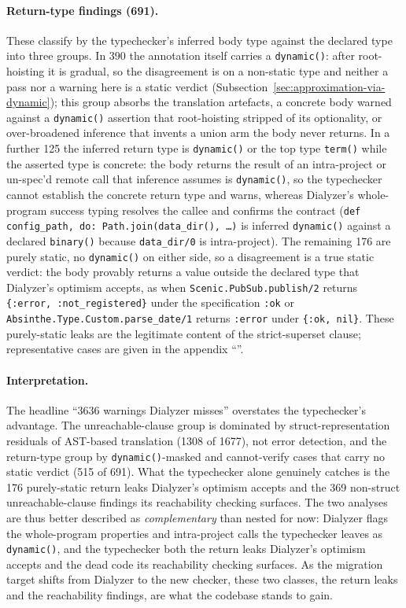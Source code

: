 \paragraph{Return-type findings (691).}
These classify by the typechecker's inferred body type against the declared type into three groups.
In \num{390} the annotation itself carries a \texttt{dynamic()}: after root-hoisting it is gradual, so the disagreement is on a non-static type and neither a pass nor a warning here is a static verdict (Subsection~\ref{sec:approximation-via-dynamic}); this group absorbs the translation artefacts, a concrete body warned against a \texttt{dynamic()} assertion that root-hoisting stripped of its optionality, or over-broadened inference that invents a union arm the body never returns.
In a further 125 the inferred return type is \texttt{dynamic()} or the top type \texttt{term()} while the asserted type is concrete: the body returns the result of an intra-project or un-spec'd remote call that inference assumes is \texttt{dynamic()}, so the typechecker cannot establish the concrete return type and warns, whereas Dialyzer's whole-program success typing resolves the callee and confirms the contract (\texttt{def config\_path, do: Path.join(data\_dir(), \dots)} is inferred \texttt{dynamic()} against a declared \texttt{binary()} because \texttt{data\_dir/0} is intra-project).
The remaining 176 are purely static, no \texttt{dynamic()} on either side, so a disagreement is a true static verdict: the body provably returns a value outside the declared type that Dialyzer's optimism accepts, as when \texttt{Scenic.PubSub.publish/2} returns \texttt{\{:error, :not\_registered\}} under the specification \texttt{:ok} or \texttt{Absinthe.Type.Custom.parse\_date/1} returns \texttt{:error} under \texttt{\{:ok, nil\}}.
These purely-static leaks are the legitimate content of the strict-superset clause; representative cases are given in the appendix ``''.

\paragraph{Interpretation.}
The headline ``\num{3636} warnings Dialyzer misses'' overstates the typechecker's advantage.
The unreachable-clause group is dominated by struct-representation residuals of AST-based translation (\num{1308} of \num{1677}), not error detection, and the return-type group by \texttt{dynamic()}-masked and cannot-verify cases that carry no static verdict (515 of 691).
What the typechecker alone genuinely catches is the 176 purely-static return leaks Dialyzer's optimism accepts and the 369 non-struct unreachable-clause findings its reachability checking surfaces.
The two analyses are thus better described as \emph{complementary} than nested for now: Dialyzer flags the whole-program properties and intra-project calls the typechecker leaves as \texttt{dynamic()}, and the typechecker both the return leaks Dialyzer's optimism accepts and the dead code its reachability checking surfaces.
As the migration target shifts from Dialyzer to the new checker, these two classes, the return leaks and the reachability findings, are what the codebase stands to gain.

